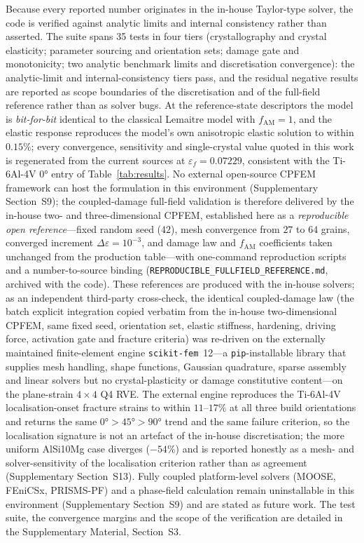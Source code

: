 \documentclass[twocolumn]{sagej}
\begin{document}
Because every reported number originates in the in-house Taylor-type solver, the code is verified against analytic limits and internal consistency rather than asserted. The suite spans 35 tests in four tiers (crystallography and crystal elasticity; parameter sourcing and orientation sets; damage gate and monotonicity; two analytic benchmark limits and discretisation convergence): the analytic-limit and internal-consistency tiers pass, and the residual negative results are reported as scope boundaries of the discretisation and of the full-field reference rather than as solver bugs. At the reference-state descriptors the model is \emph{bit-for-bit} identical to the classical Lemaitre model with $f_{\mathrm{AM}} = 1$, and the elastic response reproduces the model's own anisotropic elastic solution to within $0.15\%$; every convergence, sensitivity and single-crystal value quoted in this work is regenerated from the current sources at $\varepsilon_f = 0.07229$, consistent with the Ti-6Al-4V $\ang{0}$ entry of Table~\ref{tab:results}. No external open-source CPFEM framework can host the formulation in this environment (Supplementary Section~S9); the coupled-damage full-field validation is therefore delivered by the in-house two- and three-dimensional CPFEM, established here as a \emph{reproducible open reference}---fixed random seed ($42$), mesh convergence from $27$ to $64$ grains, converged increment $\Delta\varepsilon = 10^{-3}$, and damage law and $f_{\mathrm{AM}}$ coefficients taken unchanged from the production table---with one-command reproduction scripts and a number-to-source binding (\texttt{REPRODUCIBLE\_FULLFIELD\_REFERENCE.md}, archived with the code). These references are produced with the in-house solvers; as an independent third-party cross-check, the identical coupled-damage law (the batch explicit integration copied verbatim from the in-house two-dimensional CPFEM, same fixed seed, orientation set, elastic stiffness, hardening, driving force, activation gate and fracture criteria) was re-driven on the externally maintained finite-element engine \texttt{scikit-fem}~12---a \texttt{pip}-installable library that supplies mesh handling, shape functions, Gaussian quadrature, sparse assembly and linear solvers but no crystal-plasticity or damage constitutive content---on the plane-strain $4\times4$ Q4 RVE. The external engine reproduces the Ti-6Al-4V localisation-onset fracture strains to within $11$--$17\%$ at all three build orientations and returns the same $\ang{0}>\ang{45}>\ang{90}$ trend and the same failure criterion, so the localisation signature is not an artefact of the in-house discretisation; the more uniform AlSi10Mg case diverges ($-54\%$) and is reported honestly as a mesh- and solver-sensitivity of the localisation criterion rather than as agreement (Supplementary Section~S13). Fully coupled platform-level solvers (MOOSE, FEniCSx, PRISMS-PF) and a phase-field calculation remain uninstallable in this environment (Supplementary Section~S9) and are stated as future work. The test suite, the convergence margins and the scope of the verification are detailed in the Supplementary Material, Section~S3.
\end{document}

